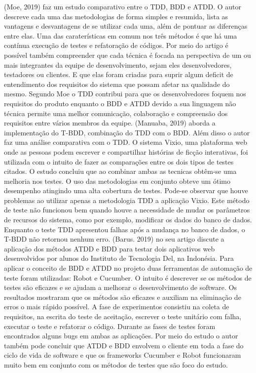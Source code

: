 \documentclass{article}
\begin{document}
    (Moe, 2019) faz um estudo comparativo entre o TDD, BDD e ATDD. O autor descreve cada uma das metodologias de forma simples e resumida, lista as
vantagens e desvantagens de se utilizar cada uma, além de pontuar as diferenças entre elas. Uma das caraterísticas em comum nos três métodos é que há
uma contínua execução de testes e refatoração de códigos. Por meio do artigo é possível também compreender que cada técnica é focada na perspectiva de
um ou mais integrantes da equipe de desenvolvimento, sejam eles desenvolvedores, testadores ou clientes. E que elas foram criadas para suprir algum
deficit de entendimento dos requisitos do sistema que possam afetar na qualidade do mesmo. Segundo Moe o TDD contribui para que os desenvolvedores
foquem nos requisitos do produto enquanto o BDD e ATDD devido a sua linguagem não técnica permite uma melhor comunicação, colaboração e compreensão dos
requisitos entre vários membros da equipe. 
(Manuaba, 2019) aborda a implementação do T-BDD, combinação do TDD com o BDD.  Além disso o autor faz uma análise comparativa com o TDD. O sistema
Vixio, uma plataforma web onde as pessoas podem escrever e compartilhar histórias de ficção interativas, foi utilizada com o intuito de fazer as
comparações entre os dois tipos de testes citados. O estudo concluiu que ao combinar ambas as tecnicas obtêm-se uma melhoria nos testes. O uso das
metodologias em conjunto obteve um ótimo desempenho atingindo uma alta cobertura de testes. Pode-se observar que houve problemas ao utilizar apenas a
metodologia TDD a aplicação Vixio. Este método de teste não funcionou bem quando houve a necessidade de mudar os parâmetros de recursos do sistema, como
por exemplo, modificar os dados do banco de dados. Enquanto o teste TDD apresentou falhas após a mudança no banco de dados, o T-BDD não retornou nenhum
erro. 
    (Barus. 2019) no seu artigo discute a aplicação dos métodos ATDD e BDD para testar dois aplicativos web desenvolvidos por alunos do Instituto de
Tecnologia Del, na Indonésia. Para aplicar o conceito de BDD e ATDD no projeto duas ferramentas de automação de teste foram utilizadas: Robot e
Cucumber. O intuito é descrever se os métodos de testes são eficazes e se ajudam a melhorar o desenvolvimento de software. Os resultados mostraram que
os métodos são eficazes e auxiliam na eliminação de erros o mais rápido possível. A fase de experimentos consistiu na coleta de requisitos, na escrita
do teste de aceitação, escrever o teste unitário com falha, executar o teste e refatorar o código. Durante as fases de testes foram encontrados alguns
bugs em ambas as aplicações. Por meio do estudo o autor também pode concluir que ATDD e BDD envolvem o cliente em toda a fase do ciclo de vida de
software e que os frameworks Cucumber e Robot funcionaram muito bem em conjunto com os métodos de testes que são foco do estudo.
\end{document}
